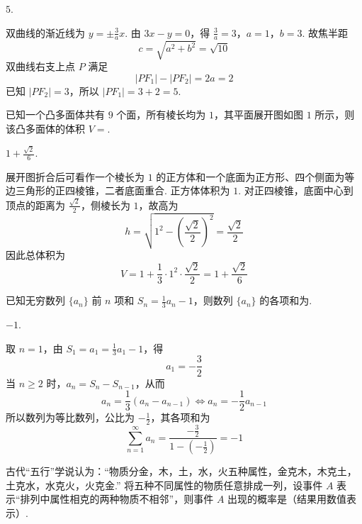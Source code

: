 \begin{answer}
\(5\).
\end{answer}

\begin{solution}
双曲线的渐近线为 \(y=\pm\frac{3}{a}x\). 由 \(3x-y=0\)，得
\(\frac3a=3\)，\(a=1\)，\(b=3\).
故焦半距
\[
c=\sqrt{a^2+b^2}=\sqrt{10}
\]
双曲线右支上点 \(P\) 满足
\[
|PF_1|-|PF_2|=2a=2
\]
已知 \(|PF_2|=3\)，所以 \(|PF_1|=3+2=5\).
\end{solution}

\begin{problem}
已知一个凸多面体共有 \(9\) 个面，所有棱长均为 \(1\)，其平面展开图如图 \(1\) 所示，则该凸多面体的体积 \(V=\)\fillinblank{}.

\end{problem}

\begin{answer}
\(1+\frac{\sqrt{2}}{6}\).
\end{answer}

\begin{solution}
展开图折合后可看作一个棱长为 \(1\) 的正方体和一个底面为正方形、四个侧面为等边三角形的正四棱锥，二者底面重合. 正方体体积为 \(1\). 对正四棱锥，底面中心到顶点的距离为 \(\frac{\sqrt2}{2}\)，侧棱长为 \(1\)，故高为
\[
h=\sqrt{1^2-\left(\frac{\sqrt2}{2}\right)^2}=\frac{\sqrt2}{2}
\]
因此总体积为
\[
V=1+\frac13\cdot1^2\cdot\frac{\sqrt2}{2}
=1+\frac{\sqrt2}{6}
\]
\end{solution}

\begin{problem}
已知无穷数列 \(\{a_n\}\) 前 \(n\) 项和 \(S_n=\frac{1}{3}a_n-1\)，则数列 \(\{a_n\}\) 的各项和为\fillinblank{}.
\end{problem}

\begin{answer}
\(-1\).
\end{answer}

\begin{solution}
取 \(n=1\)，由 \(S_1=a_1=\frac13a_1-1\)，得
\[
a_1=-\frac32
\]
当 \(n\geqslant2\) 时，\(a_n=S_n-S_{n-1}\)，从而
\[
a_n=\frac13(a_n-a_{n-1})
\iff a_n=-\frac12a_{n-1}
\]
所以数列为等比数列，公比为 \(-\frac12\)，其各项和为
\[
\sum_{n=1}^{\infty}a_n
=\frac{-\frac{3}{2}}{1-(-\frac{1}{2})}=-1
\]
\end{solution}

\begin{problem}
古代“五行”学说认为：“物质分金，木，土，水，火五种属性，金克木，木克土，土克水，水克火，火克金.” 将五种不同属性的物质任意排成一列，设事件 \(A\) 表示“排列中属性相克的两种物质不相邻”，则事件 \(A\) 出现的概率是（结果用数值表示）\fillinblank{}.
\end{problem}

